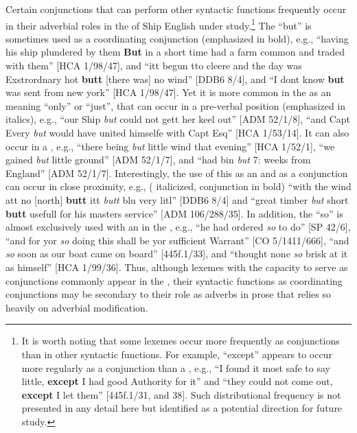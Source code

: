 Certain conjunctions that can perform other syntactic functions frequently occur in their adverbial roles in the  of Ship English under study.\footnote{It is worth noting that some lexemes occur more frequently as conjunctions than in other syntactic functions. For example, “except” appears to occur more regularly as a conjunction than a , e.g., “I found it most safe to say little, \textbf{except} I had good Authority for it” and “they could not come out, \textbf{except} I let them” [445f.1/31, and 38]. Such distributional frequency is not presented in any detail here but identified as a potential direction for future study.}  The  “but” is sometimes used as a coordinating conjunction (emphasized in bold), e.g., “having his ship plundered by them \textbf{But} in a short time had a farm common and traded with them” [HCA 1/98/47], and “itt begun tto cleere and the day was Exstrordnary hot \textbf{butt} [there was] no wind” [DDB6 8/4], and “I dont know \textbf{but} was sent from new york” [HCA 1/98/47]. Yet it is more common in the  as an  meaning “only” or “just”, that can occur in a pre-verbal position (emphasized in italics), e.g., “our Ship \textit{but} could not gett her keel out” [ADM 52/1/8], “and Capt Every \textit{but} would have united himselfe with Capt Esq” [HCA 1/53/14]. It can also occur in a , e.g., “there being \textit{but} little wind that evening” [HCA 1/52/1], “we gained \textit{but} little ground” [ADM 52/1/7], and “had bin \textit{but} 7: weeks from England” [ADM 52/1/7]. Interestingly, the use of this  as an  and as a conjunction can occur in close proximity, e.g., ( italicized, conjunction in bold) “with the wind att no [north] \textbf{butt} itt \textit{butt} blu very litl” [DDB6 8/4] and “great timber \textit{but} short \textbf{butt} usefull for his masters service” [ADM 106/288/35]. In addition, the  “so” is almost exclusively used with an  in the , e.g., “he had ordered \textit{so} to do” [SP 42/6], “and for yor \textit{so} doing this shall be yor sufficient Warrant” [CO 5/1411/666], “and \textit{so} soon as our boat came on board” [445f.1/33], and “thought none \textit{so} brisk at it as himself” [HCA 1/99/36]. Thus, although lexemes with the capacity to serve as conjunctions commonly appear in the , their syntactic functions as coordinating conjunctions may be secondary to their role as adverbs in prose that relies so heavily on adverbial modification. 

